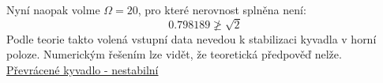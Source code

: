 \documentclass{beamer}
\begin{document}
\begin{frame}
\begin{center}
	Nyní naopak volme $\Omega=20$, pro které nerovnost splněna není:
\begin{equation*}
0.798189 \ngeq \sqrt{2}
\end{equation*}
	Podle teorie takto volená vstupní data nevedou k stabilizaci kyvadla v horní poloze. Numerickým řešením lze vidět, že teoretická předpověď nelže.
\\

\href{run:./animace2.mp4}{Převrácené kyvadlo - nestabilní}
\end{center}
\end{frame}
\end{document}
